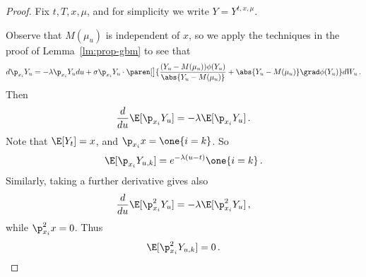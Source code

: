 \documentclass{amsart}
\begin{document}
\begin{proof}
	Fix $t,T,x,\mu$, and for simplicity we write $Y = Y^{t,x,\mu}$.

	Observe that $M(\mu_u)$ is independent of $x$, so we apply the techniques in the proof of Lemma~\ref{lm:prop-gbm} to see that 
	\begin{equation*}
		d \p_{x_i} Y_u = -\lambda \p_{x_i} Y_u du + \sigma \p_{x_i} Y_u \cdot \paren[\big]{ \frac{(Y_u - M(\mu_u)) \phi(Y_u)}{\abs{Y_u - M(\mu_u)}} + \abs{Y_u - M(\mu_u)} \grad\phi(Y_u) } dW_u  \,.
	\end{equation*}
	Then 
	\begin{equation*}
		\frac{d}{du} \E [\p_{x_i} Y_u] = -\lambda \E[\p_{x_i} Y_u] \,.
	\end{equation*}
	Note that $\E[Y_t] = x$, and $\p_{x_i} x = \one{i=k}$. 
	So 
	\begin{equation*}
		\E [\p_{x_i} Y_{u,k}] = e^{-\lambda (u-t)} \one{i=k} \,.
	\end{equation*}
	Similarly, taking a further derivative gives also 
	\begin{equation*}
		\frac{d}{du} \E [\p_{x_i}^2 Y_u] = -\lambda \E[\p_{x_i}^2 Y_u] \,,
	\end{equation*}
	while $\p_{x_i}^2 x = 0$. 
	Thus 
	\begin{equation*}
		\E [\p_{x_i}^2 Y_{u,k}] = 0 \,.
	\end{equation*}


\end{proof}
\end{document}
